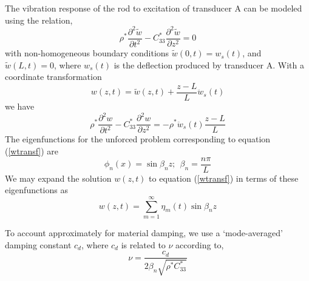\documentclass[11pt,letterpaper]{article}%
\begin{document}
The vibration response of the rod to excitation of transducer A
can be modeled using the relation,
\begin{equation}
\rho^\ast \frac{\partial^2 {\tilde w}}{\partial t^2} - C^\ast_{33}
\frac{\partial^2 {\tilde w}}{\partial z^2} = 0 \label{vibax1}
\end{equation}%
%
%
with non-homogeneous boundary conditions ${\tilde w}(0,t) =
w_s(t)$, and ${\tilde w}(L,t) = 0$, where $w_s(t)$ is the
deflection produced by transducer A.  With a coordinate
transformation
\begin{equation}
{ w}(z,t) = {\tilde w}(z,t) + \frac{z-L}{L}{\ddot w}_s(t)
\label{wtilde}
\end{equation}
we have
\begin{equation}
\rho^\ast \frac{\partial^2 w}{\partial t^2} -
C^\ast_{33}\frac{\partial^2 w}{\partial z^2} = -\rho^\ast {\ddot
w}_s(t)\frac{z-L}{L} \label{wtransf}
\end{equation}
The eigenfunctions for the unforced problem corresponding to
equation (\ref{wtransf}) are
\[\phi_n(x) = \sin \beta_n z;\ \ \beta_n = \frac{n\pi}{L}\]
We may expand the solution $w(z,t)$ to equation (\ref{wtransf}) in
terms of these eigenfunctions as
\begin{equation}
w(z,t) = \sum_{m=1}^{\infty}\eta_m(t)\sin \beta_n z
\label{wvibexp}
\end{equation}

To account approximately for material damping, we use a
`mode-averaged' damping constant $c_d$, where $c_d$ is related to
$\nu$ according to,
\begin{equation}
\nu = \frac{c_d}{2\beta_n\sqrt{\rho^\ast C^{\ast}_{33}}}
\label{gameq1}
\end{equation}
\end{document}
